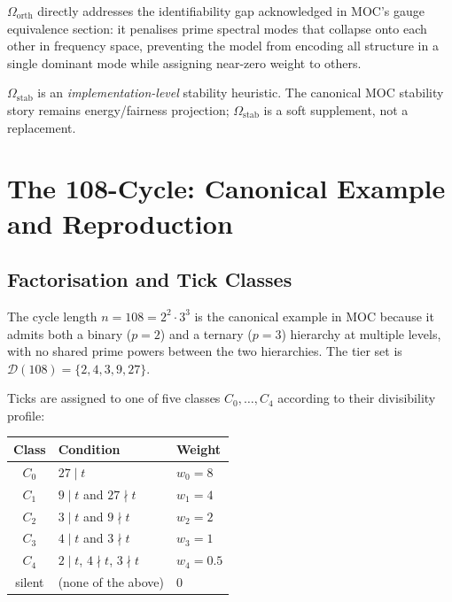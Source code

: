 \documentclass[11pt,a4paper]{article}
\theoremstyle{plain}
\theoremstyle{definition}
\theoremstyle{remark}
\newcommand{\tiers}{\mathcal{D}}
\begin{document}
$\Omega_\mathrm{orth}$ directly addresses the identifiability gap acknowledged in MOC's
gauge equivalence section: it penalises prime spectral modes that collapse onto each other
in frequency space, preventing the model from encoding all structure in a single dominant
mode while assigning near-zero weight to others.

$\Omega_\mathrm{stab}$ is an \textit{implementation-level} stability heuristic. The canonical
MOC stability story remains energy/fairness projection; $\Omega_\mathrm{stab}$ is a soft
supplement, not a replacement.

\section{The 108-Cycle: Canonical Example and Reproduction}
\label{sec:108cycle}

\subsection{Factorisation and Tick Classes}

The cycle length $n = 108 = 2^2 \cdot 3^3$ is the canonical example in MOC because
it admits both a binary ($p=2$) and a ternary ($p=3$) hierarchy at multiple levels,
with no shared prime powers between the two hierarchies. The tier set is
$\tiers(108) = \{2, 4, 3, 9, 27\}$.

Ticks are assigned to one of five classes $C_0, \ldots, C_4$ according to their
divisibility profile:

\begin{center}
\begin{tabular}{cll}
  \toprule
  Class & Condition & Weight \\
  \midrule
  $C_0$ & $27 \mid t$ & $w_0 = 8$ \\
  $C_1$ & $9 \mid t$ and $27 \nmid t$ & $w_1 = 4$ \\
  $C_2$ & $3 \mid t$ and $9 \nmid t$ & $w_2 = 2$ \\
  $C_3$ & $4 \mid t$ and $3 \nmid t$ & $w_3 = 1$ \\
  $C_4$ & $2 \mid t$, $4 \nmid t$, $3 \nmid t$ & $w_4 = 0.5$ \\
  silent & (none of the above) & $0$ \\
  \bottomrule
\end{tabular}
\end{center}
\end{document}
